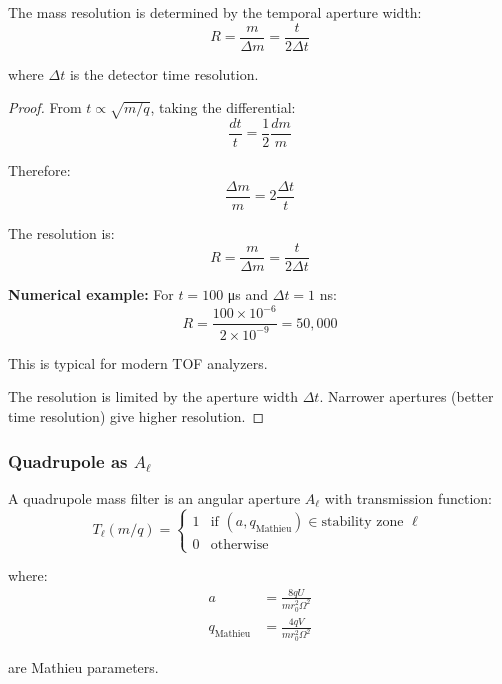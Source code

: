 \begin{corollary}
\label{cor:tof_resolution}
The mass resolution is determined by the temporal aperture width:
\begin{equation}
R = \frac{m}{\Delta m} = \frac{t}{2\Delta t}
\end{equation}

where $\Delta t$ is the detector time resolution.
\end{corollary}

\begin{proof}
From $t \propto \sqrt{m/q}$, taking the differential:
\begin{equation}
\frac{dt}{t} = \frac{1}{2} \frac{dm}{m}
\end{equation}

Therefore:
\begin{equation}
\frac{\Delta m}{m} = 2\frac{\Delta t}{t}
\end{equation}

The resolution is:
\begin{equation}
R = \frac{m}{\Delta m} = \frac{t}{2\Delta t}
\end{equation}

\textbf{Numerical example:} For $t = 100$ μs and $\Delta t = 1$ ns:
\begin{equation}
R = \frac{100 \times 10^{-6}}{2 \times 10^{-9}} = 50,000
\end{equation}

This is typical for modern TOF analyzers.

The resolution is limited by the aperture width $\Delta t$. Narrower apertures (better time resolution) give higher resolution.
\end{proof}

\subsubsection{Quadrupole as $A_\ell$}

\begin{theorem}
\label{thm:quadrupole_angular}
A quadrupole mass filter is an angular aperture $A_\ell$ with transmission function:
\begin{equation}
T_\ell(m/q) = \begin{cases}
1 & \text{if } (a, q_{\text{Mathieu}}) \in \text{stability zone } \ell \\
0 & \text{otherwise}
\end{cases}
\end{equation}

where:
\begin{align}
a &= \frac{8qU}{mr_0^2\Omega^2} \\
q_{\text{Mathieu}} &= \frac{4qV}{mr_0^2\Omega^2}
\end{align}

are Mathieu parameters.
\end{theorem}

